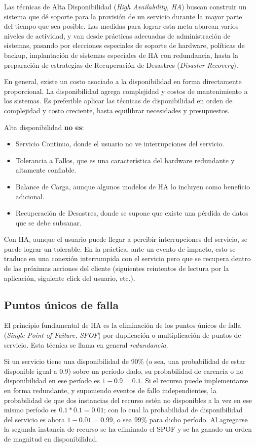 Las técnicas de Alta Disponibilidad (\textit{High Availability, HA}) buscan construir un sistema que dé soporte para la provisión de un servicio durante la mayor parte del tiempo que sea posible. Las medidas para lograr esta meta abarcan varios niveles de actividad, y van desde prácticas adecuadas de administración de sistemas, pasando por elecciones especiales de soporte de hardware, políticas de backup, implantación de sistemas especiales de HA con redundancia, hasta la preparación de estrategias de Recuperación de Desastres (\textit{Disaster Recovery}). 

En general, existe un costo asociado a la disponibilidad en forma directamente proporcional. La disponibilidad agrega complejidad y costos de mantenimiento a los sistemas. Es preferible aplicar las técnicas de disponibilidad en orden de complejidad y costo creciente, hasta equilibrar necesidades y presupuestos.

Alta disponibilidad \textbf{no es}:
\begin{itemize}
	\item Servicio Continuo, donde el usuario no ve interrupciones del servicio.
	\item Tolerancia a Fallos, que es una característica del hardware redundante y altamente confiable.
	\item Balance de Carga, aunque algunos modelos de HA lo incluyen como beneficio adicional.
	\item Recuperación de Desastres, donde se supone que existe una pérdida de datos que se debe subsanar.
\end{itemize}

Con HA, aunque el usuario puede llegar a percibir interrupciones del servicio, se puede lograr un  tolerable. En la práctica, ante un evento de impacto, esto se traduce en una conexión interrumpida con el servicio pero que se recupera dentro de las próximas acciones del cliente (siguientes reintentos de lectura por la aplicación, siguiente click del usuario, etc.). 

\subsection{Puntos únicos de falla}
El principio fundamental de HA es la eliminación de los puntos únicos de falla (\textit{Single Point of Failure, SPOF}) por duplicación o multiplicación de puntos de servicio. Esta técnica se llama en general \textit{redundancia}. 

Si un servicio tiene una disponibilidad de 90\% (o sea, una probabilidad de estar disponible igual a 0.9) sobre un período dado, su probabilidad de carencia o no disponibilidad en ese período es $1 - 0.9 = 0.1$. Si el recurso puede implementarse en forma redundante, y suponiendo eventos de fallo independientes, la probabilidad de que dos instancias del recurso estén no disponibles a la vez en ese mismo período es $0.1 * 0.1 = 0.01$; con lo cual la probabilidad de disponibilidad del servicio es ahora $1 - 0.01 = 0.99$, o sea 99\% para dicho período. Al agregarse la segunda instancia de recurso se ha eliminado el SPOF y se ha ganado un orden de magnitud en disponibilidad.
 
